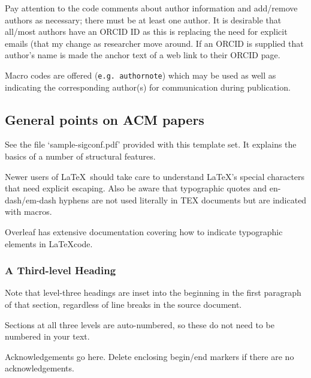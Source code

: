 \documentclass[sigconf]{acmart}
\begin{document}
Pay attention to the code comments about author information and add/remove authors as necessary; there must be at least one author. It is desirable that all/most authors have an ORCID ID as this is replacing the need for explicit emails (that my change as researcher move around. If an ORCID is supplied that author's name is made the anchor text of a web link to their ORCID page. 

Macro codes are offered (\texttt{e.g. authornote}) which may be used as well as indicating the corresponding author(s) for communication during publication.

\subsection{General points on ACM papers}
See the file `sample-sigconf.pdf' provided with this template set. It explains the basics of a number of structural features.

Newer users of \LaTeX\ should take care to understand \LaTeX's special characters that need explicit escaping. Also be aware that typographic quotes and en-dash/em-dash hyphens are not used literally in TEX documents but are indicated with macros.

Overleaf has extensive documentation covering how to indicate typographic elements in \LaTeX code.

\subsubsection{A Third-level Heading} 
Note that level-three headings are inset into the beginning in the first paragraph of that section, regardless of line breaks in the source document.

Sections at all three levels are auto-numbered, so these do not need to be numbered in your text.


\begin{acks}
Acknowledgements go here. Delete enclosing begin/end markers if there are no acknowledgements.
\end{acks}




\end{document}
